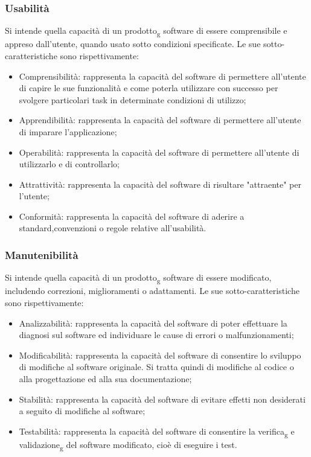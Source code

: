 \subsubsection{Usabilità}
Si intende quella capacità di un prodotto\textsubscript{g} software di essere comprensibile e appreso dall'utente, quando usato sotto condizioni specificate.
Le sue sotto-caratteristiche sono rispettivamente:
\begin{itemize}
\item Comprensibilità: rappresenta la capacità del software di permettere all'utente di capire le sue funzionalità e come poterla utilizzare con successo per svolgere particolari task in determinate condizioni di utilizzo;
\item Apprendibilità: rappresenta la capacità del software di permettere all'utente di imparare l'applicazione;
\item Operabilità: rappresenta la capacità del software di permettere all'utente di utilizzarlo e di controllarlo;
\item Attrattività: rappresenta la capacità del software di risultare "attraente" per l'utente;
\item Conformità: rappresenta la capacità del software di aderire a standard,convenzioni o regole relative all'usabilità.
\end{itemize}

\subsubsection{Manutenibilità}
Si intende quella capacità di un prodotto\textsubscript{g} software di essere modificato, includendo correzioni, miglioramenti o adattamenti.
Le sue sotto-caratteristiche sono rispettivamente:
\begin{itemize}
\item Analizzabilità: rappresenta la capacità del software di poter effettuare la diagnosi sul software ed individuare le cause di errori o malfunzionamenti;
\item Modificabilità: rappresenta la capacità del software di consentire lo sviluppo di modifiche al software originale. Si tratta quindi di modifiche al codice o alla progettazione ed alla sua documentazione;
\item Stabilità: rappresenta la capacità del software di evitare effetti non desiderati a seguito di modifiche al software;
\item Testabilità: rappresenta la capacità del software di consentire la verifica\textsubscript{g} e validazione\textsubscript{g} del software modificato, cioè di eseguire i test.
\end{itemize}

